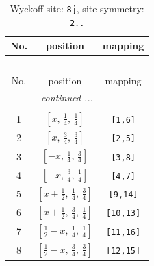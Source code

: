 \documentclass[fleqn,8pt]{jsarticle}
\begin{document}
\begin{longtable}{ccc}
\caption{Wyckoff site: {\tt 8j}, site symmetry: {\tt 2..}}
 \\
 \hline \hline
No. & position & mapping \\ \hline \endfirsthead

\multicolumn{2}{l}{\tablename\ \thetable{}} \\
 \hline \hline
No. & position & mapping \\ \hline \endhead

 \hline \hline
\multicolumn{2}{r}{\footnotesize\it continued ...} \\ \endfoot

 \hline \hline
\multicolumn{2}{r}{} \\ \endlastfoot

1 & $\left[ x,\, \frac{1}{4},\, \frac{1}{4} \right]$ & {\tt [1,6]} \\ \hline
2 & $\left[ x,\, \frac{3}{4},\, \frac{3}{4} \right]$ & {\tt [2,5]} \\ \hline
3 & $\left[ - x,\, \frac{1}{4},\, \frac{3}{4} \right]$ & {\tt [3,8]} \\ \hline
4 & $\left[ - x,\, \frac{3}{4},\, \frac{1}{4} \right]$ & {\tt [4,7]} \\ \hline
5 & $\left[ x + \frac{1}{2},\, \frac{1}{4},\, \frac{3}{4} \right]$ & {\tt [9,14]} \\ \hline
6 & $\left[ x + \frac{1}{2},\, \frac{3}{4},\, \frac{1}{4} \right]$ & {\tt [10,13]} \\ \hline
7 & $\left[ \frac{1}{2} - x,\, \frac{1}{4},\, \frac{1}{4} \right]$ & {\tt [11,16]} \\ \hline
8 & $\left[ \frac{1}{2} - x,\, \frac{3}{4},\, \frac{3}{4} \right]$ & {\tt [12,15]} \\
\end{longtable}
\renewcommand{\arraystretch}{1.2}
\end{document}
